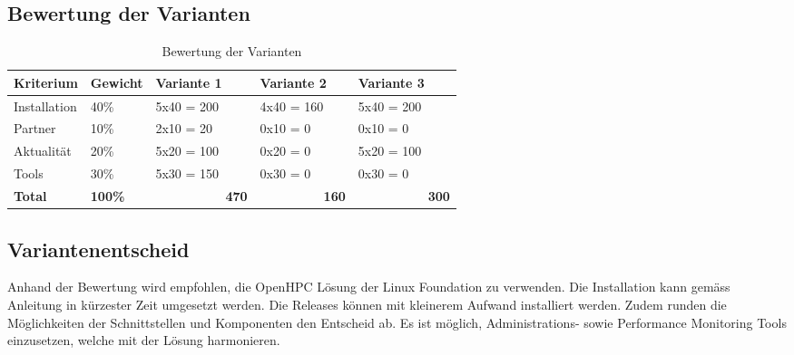 \subsection{Bewertung der Varianten}
\begin{table}[H]
\centering
\begin{tabular}{p{2cm}p{2cm}p{4cm}p{4cm}p{4cm}}
\hline
\rowcolor{heading} \textbf{Kriterium} & \textbf{Gewicht} & \textbf{Variante 1} & \textbf{Variante 2}& \textbf{Variante 3} \\\hline
Installation & 40\% & 5x40 = 200 & 4x40 = 160 & 5x40 = 200 \\\hline
Partner & 10\% & 2x10 = 20 & 0x10 = 0 & 0x10 = 0 \\\hline
Aktualität & 20\% & 5x20 = 100 & 0x20 = 0 & 5x20 = 100 \\\hline
Tools & 30\% & 5x30 = 150 & 0x30 = 0 & 0x30 = 0\\\hline
\textbf{Total} & \textbf{100\%} & \ \ \ \ \ \ \ \ \ \ \ \textbf{470} & \ \ \ \ \ \ \ \ \ \ \textbf{160} & \ \ \ \ \ \ \ \ \ \ \ \textbf{300} \\\hline
\end{tabular}
\caption{Bewertung der Varianten}
\end{table}

\subsection{Variantenentscheid}
Anhand der Bewertung wird empfohlen, die OpenHPC Lösung der Linux Foundation zu verwenden. Die Installation kann gemäss Anleitung in kürzester Zeit umgesetzt werden. Die Releases können mit kleinerem Aufwand installiert werden. Zudem runden die Möglichkeiten der Schnittstellen und Komponenten den Entscheid ab. Es ist möglich, Administrations- sowie Performance Monitoring Tools einzusetzen, welche mit der Lösung harmonieren.
